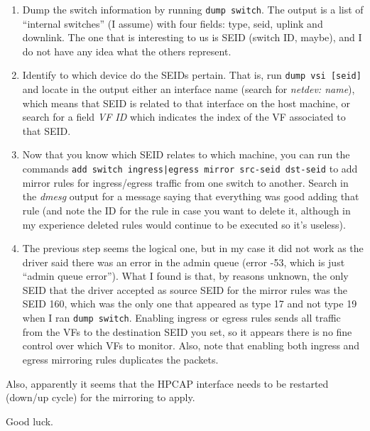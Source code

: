 \begin{enumerate}
	\item Dump the switch information by running \texttt{dump switch}. The output is a list of ``internal switches'' (I assume) with four fields: type, seid, uplink and downlink. The one that is interesting to us is SEID (switch ID, maybe), and I do not have any idea what the others represent.
	\item Identify to which device do the SEIDs pertain. That is, run \texttt{dump vsi [seid]} and locate in the output either an interface name (search for \textit{netdev: name}), which means that SEID is related to that interface on the host machine, or search for a field \textit{VF ID} which indicates the index of the VF associated to that SEID.
	\item Now that you know which SEID relates to which machine, you can run the commands \texttt{add switch ingress|egress mirror src-seid dst-seid} to add mirror rules for ingress/egress traffic from one switch to another. Search in the \textit{dmesg} output for a message saying that everything was good adding that rule (and note the ID for the rule in case you want to delete it, although in my experience deleted rules would continue to be executed so it's useless).
	\item The previous step seems the logical one, but in my case it did not work as the driver said there was an error in the admin queue (error -53, which is just ``admin queue error''). What I found is that, by reasons unknown, the only SEID that the driver accepted as source SEID for the mirror rules was the SEID 160, which was the only one that appeared as type 17 and not type 19 when I ran \texttt{dump switch}. Enabling ingress or egress rules sends all traffic from the VFs to the destination SEID you set, so it appears there is no fine control over which VFs to monitor. Also, note that enabling both ingress and egress mirroring rules duplicates the packets.
\end{enumerate}

Also, apparently it seems that the HPCAP interface needs to be restarted (down/up cycle) for the mirroring to apply.

Good luck.





